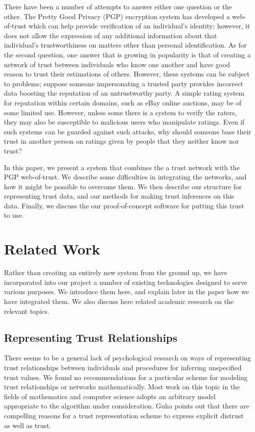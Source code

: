\documentclass{acm_proc_article-sp}
\begin{document}
There have been a number of attempts to answer either one question or the other.  The Pretty Good Privacy (PGP) encryption system has developed a web-of-trust which can help provide verification of an individual's identity;  however, it does not allow the expression of any additional information about that individual's trustworthiness on matters other than personal identification.  As for the second question, one answer that is growing in popularity is that of creating a network of trust between individuals who know one another and have good reason to trust their estimations of others.  However, these systems can be subject to problems; suppose someone impersonating a trusted party provides incorrect data boosting the reputation of an untrustworthy party.  A simple rating system for reputation within certain domains, such as eBay online auctions, may be of some limited use.  However, unless some there is a system to verify the raters, they may also be susceptible to malicious users who manipulate ratings.  Even if such systems can be guarded against such attacks, why should someone base their trust in another person on ratings given by people that they neither know nor trust?

In this paper, we present a system that combines the a trust network with the PGP web-of-trust.  We describe some difficulties in integrating the networks, and how it might be possible to overcome them.  We then describe our structure for representing trust data, and our methods for making trust inferences on this data.  Finally, we discuss the our proof-of-concept software for putting this trust to use.

\section{Related Work}
Rather than creating an entirely new system from the ground up, we have incorporated into our project a number of existing technologies designed to serve various purposes.  We introduce them here, and explain later in the paper how we have integrated them.  We also discuss here  related academic research on the relevant topics.

\subsection{Representing Trust Relationships}
There seems to be a general lack of psychological research on ways of representing trust relationships between individuals and procedures for inferring unspecified trust values.  We found no recommendations for a particular scheme for modeling trust relationships or networks mathematically.  Most work on this topic in the fields of mathematics and computer science adopts an arbitrary model appropriate to the algorithm under consideration. Guha points out \citep{guha04propagation} that there are compelling reasons for a trust representation scheme to express explicit distrust as well as trust.
\end{document}
